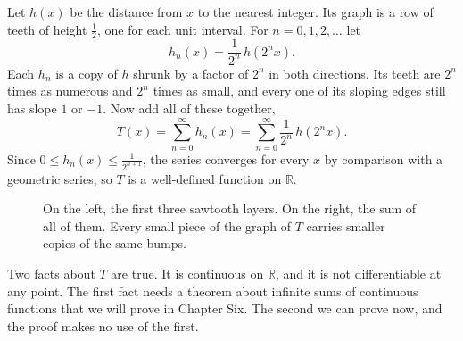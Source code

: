 Let $h(x)$ be the distance from $x$ to the nearest integer.  Its graph is a row of teeth of height $\frac12$, one for each unit interval.  For $n = 0, 1, 2, \ldots$ let
\[ h_n(x) = \frac{1}{2^n}\,h(2^n x). \]
Each $h_n$ is a copy of $h$ shrunk by a factor of $2^n$ in both directions.  Its teeth are $2^n$ times as numerous and $2^n$ times as small, and every one of its sloping edges still has slope $1$ or $-1$.  Now add all of these together,
\[ T(x) = \sum_{n=0}^{\infty} h_n(x) = \sum_{n=0}^{\infty} \frac{1}{2^n}\,h(2^n x). \]
Since $0 \leq h_n(x) \leq \frac{1}{2^{n+1}}$, the series converges for every $x$ by comparison with a geometric series, so $T$ is a well-defined function on $\mathbb{R}$.

\begin{figure}
\centering
{}
\caption{On the left, the first three sawtooth layers.  On the right, the sum of all of them.  Every small piece of the graph of $T$ carries smaller copies of the same bumps.}
\label{fig:takagi}
\end{figure}

Two facts about $T$ are true.  It is continuous on $\mathbb{R}$, and it is not differentiable at any point.  The first fact needs a theorem about infinite sums of continuous functions that we will prove in Chapter Six.  The second we can prove now, and the proof makes no use of the first.

